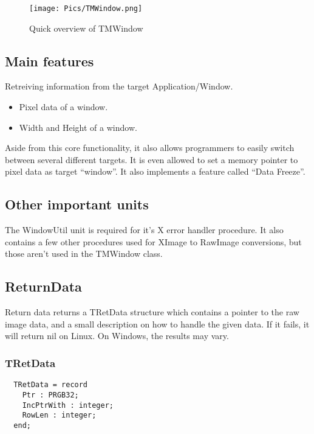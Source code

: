 \documentclass[a4paper]{report}
\begin{document}
\begin{center}
	\begin{figure}[ht]
		\texttt{[image: Pics/TMWindow.png]}
		\caption{Quick overview of TMWindow}
	\end{figure}
\end{center}

\subsection{Main features}

Retreiving information from the target Application/Window.
\begin{itemize}
	\item Pixel data of a window.
	\item Width and Height of a window.
\end{itemize}

Aside from this core functionality, it also allows programmers to easily switch
between several different targets. It is even allowed to set a memory pointer to
pixel data as target ``window''. It also implements a feature called ``Data
Freeze''.

\subsection{Other important units}

The WindowUtil unit is required for it's X error handler procedure. It also
contains a few other procedures used for XImage to RawImage conversions, but
those aren't used in the TMWindow class.

\subsection{ReturnData}

Return data returns a TRetData structure which contains a pointer to the 
raw image data, and a small description on how to handle the given data.
If it fails, it will return nil on Linux. On Windows, the results may vary.

\subsubsection{TRetData}
\begin{verbatim}
  TRetData = record
    Ptr : PRGB32;
    IncPtrWith : integer;
    RowLen : integer;
  end;
\end{verbatim}
\end{document}
